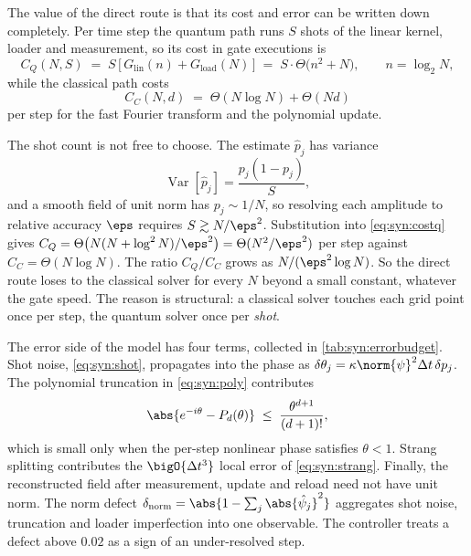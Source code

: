 The value of the direct route is that its cost and error can be written down completely. Per time step the quantum path runs $S$ shots of the linear kernel, loader and measurement, so its cost in gate executions is
\begin{equation}\label{eq:syn:costq}
  C_Q(N,S) \;=\; S\,\big[\,G_{\mathrm{lin}}(n) + G_{\mathrm{load}}(N)\,\big]
  \;=\; S\cdot\Theta\!\big(n^{2}+N\big),\qquad n=\log_2 N,
\end{equation}
while the classical path costs
\begin{equation}\label{eq:syn:costc}
  C_C(N,d) \;=\; \Theta(N\log N) + \Theta(Nd)
\end{equation}
per step for the fast Fourier transform and the polynomial update.

The shot count is not free to choose. The estimate $\hat p_j$ has variance
\begin{equation}\label{eq:syn:shot}
  \operatorname{Var}[\hat p_j]=\frac{p_j(1-p_j)}{S},
\end{equation}
and a smooth field of unit norm has $p_j\sim 1/N$, so resolving each amplitude to relative accuracy $\eps$ requires $S\gtrsim N/\eps^{2}$. Substitution into \cref{eq:syn:costq} gives $C_Q=\Theta\big(N(N+\log^{2}N)/\eps^{2}\big)=\Theta(N^{2}/\eps^{2})$ per step against $C_C=\Theta(N\log N)$. The ratio $C_Q/C_C$ grows as $N/(\eps^{2}\log N)$. So the direct route loses to the classical solver for every $N$ beyond a small constant, whatever the gate speed. The reason is structural: a classical solver touches each grid point once per step, the quantum solver once per \emph{shot}.

The error side of the model has four terms, collected in \cref{tab:syn:errorbudget}. Shot noise, \cref{eq:syn:shot}, propagates into the phase as $\delta\theta_j=\kappa\norm{\psi}^{2}\Delta t\,\delta p_j$. The polynomial truncation in \cref{eq:syn:poly} contributes
\begin{equation}\label{eq:syn:trunc}
  \abs{e^{-i\theta}-P_d(\theta)}\;\le\;\frac{\theta^{d+1}}{(d+1)!},
\end{equation}
which is small only when the per-step nonlinear phase satisfies $\theta<1$. Strang splitting contributes the $\bigO{\Delta t^{3}}$ local error of \cref{eq:syn:strang}. Finally, the reconstructed field after measurement, update and reload need not have unit norm. The norm defect $\delta_{\mathrm{norm}}=\abs{1-\sum_j\abs{\hat\psi_j}^{2}}$ aggregates shot noise, truncation and loader imperfection into one observable. The controller treats a defect above $0.02$ as a sign of an under-resolved step.

